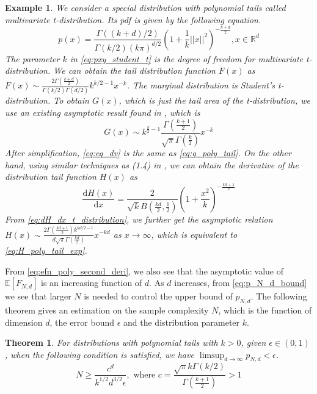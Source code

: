 \documentclass[conference,a4paper]{IEEEtran}
\def\E{\mathbb{E}}
\def\dd{\mathrm{d}}
\newtheorem{theorem}{Theorem}
\newtheorem{example}{Example}
\begin{document}
\begin{example}
     We consider a special distribution with polynomial tails called multivariate t-distribution.
     Its pdf is given by the following equation.
     \begin{equation}\label{eq:pxy_student_t}
          p(x) = \frac{\Gamma((k+d)/2)}{\Gamma(k/2)(k\pi)^{d/2}}
          \left(1+\frac{1}{k}||x||^2
          \right)^{-\frac{k+d}{2}}, x \in \mathbb{R}^d
      \end{equation}
      The parameter $k$ in \eqref{eq:pxy_student_t} is the degree of freedom for multivariate t-distribution.
      We can obtain the tail distribution function
      $F(x)$ as $F(x) \sim \frac{2\Gamma(\frac{k+d}{2})}{\Gamma(k/2)\Gamma(d/2)} k^{k/2-1} x^{-k}$.
      The marginal distribution is Student's t-distribution. To obtain $G(x)$, which is just the tail area
of the t-distribution, we use an existing asymptotic result found in \cite{andrew1976}, which is
\begin{equation} \label{eq:eq_dv}
    G(x) \sim k^{\frac{k}{2}-1} \frac{\Gamma \left(\frac{k+1}{2} \right)}
    {\sqrt{\pi} \Gamma\left(\frac{k}{2}\right)}x^{-k}
\end{equation}
After simplification, \eqref{eq:eq_dv} is the same as \eqref{eq:g_poly_tail}.
On the other hand, using similar techniques as (1.4) in \cite{raynaud1970enveloppe},
we can obtain the derivative of the distribution tail function $H(x)$ as
\begin{equation}\label{eq:dH_dx_t_distribution}
     \frac{\dd H(x)}{\dd x} =  \frac{2}{\sqrt{k} B(\frac{kd}{2},\frac{1}{2})} \left(1 + \frac{x^2}{k} \right)^{-\frac{kd+1}{2}} 
\end{equation}
From \eqref{eq:dH_dx_t_distribution}, we further get the asymptotic relation $H(x) \sim \frac{2 \Gamma(\frac{kd+1}{2}) k^{kd/2-1}}{d\sqrt{\pi} \Gamma(\frac{kd}{2})}
x^{-kd}$ as $x\to \infty$, which is equivalent to \eqref{eq:H_poly_tail_exp}.

\end{example}
From \eqref{eq:efn_poly_second_deri}, we also see that
the asymptotic value of $\E[F_{N,d}]$ is an increasing function of $d$.
As $d$ increases, from \eqref{eq:p_N_d_bound} we see that larger $N$ is needed to control the upper bound of $p_{N,d}$.
The following theorem gives an estimation on the sample complexity $N$,
which is the function of dimension $d$, the error bound $\epsilon$ and the distribution parameter $k$.
\begin{theorem}\label{thm:poly_tail_sample_complexity}
  For distributions with polynomial tails with $k>0$, given $\epsilon \in (0,1)$,
  when the following condition is satisfied,
  we have $\limsup_{d\to\infty} p_{N,d} < \epsilon$.
\begin{equation}\label{eq:N_c_d_3_2}
  N  \geq \frac{c^d}{k^{1/2}d^{3/2} \epsilon}, \textrm{ where } c=\frac{\sqrt{\pi}k\Gamma(k/2)}{\Gamma(\frac{k+1}{2})}>1  
\end{equation}
\end{theorem}
\end{document}
